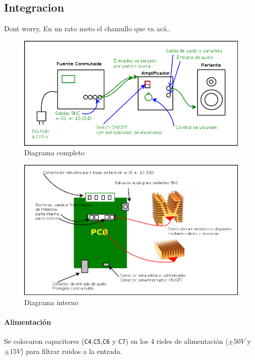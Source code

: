 \documentclass[a4paper,12pt,twoside]{article}
\begin{document}
\subsection{Integracion}

Dont worry, En un rato meto el chamullo que va acá..

\begin{figure}[H]
\centering
\includegraphics[width=1\textwidth]{img/integracion/diagrama_completo}
\caption{Diagrama completo}
\label{fig:diag_completo} 
\end{figure}

\begin{figure}[H]
\centering
\includegraphics[width=1\textwidth]{img/integracion/diagrama_interno}
\caption{Diagrama interno}
\label{fig:circuito} 
\end{figure}



\paragraph{Alimentación}

Se colocaron capacitores (\texttt{C4},\texttt{C5},\texttt{C6} y \texttt{C7}) en los 4 rieles de alimentación ($\pm 50V$ y $\pm 15V$) para filtrar ruidos a la entrada.
\end{document}
